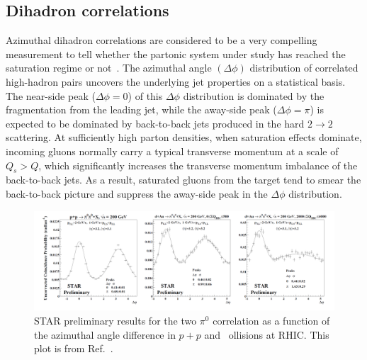 \subsection{Dihadron correlations}
Azimuthal dihadron
correlations are considered to be a very compelling measurement to tell whether
the partonic system under study has reached the saturation regime or
not~\cite{Kharzeev:2004bw}. The azimuthal angle $(\Delta\phi)$ distribution of
correlated high-\pt hadron pairs uncovers the underlying jet properties on a
statistical basis. The near-side peak ($\Delta\phi=0$) of this $\Delta\phi$
distribution is dominated by the fragmentation from the leading jet, while the
away-side peak ($\Delta\phi=\pi$) is expected to be dominated by back-to-back
jets produced in the hard $2\rightarrow2$ scattering. At sufficiently high
parton densities, when saturation effects dominate, incoming gluons normally
carry a typical transverse momentum at a scale of $Q_{s}>Q$, which significantly
increases the transverse momentum imbalance of the back-to-back jets. As a
result, saturated gluons from the target tend to smear the back-to-back picture
and suppress the away-side peak in the $\Delta\phi$ distribution.

\begin{figure}
\centering
\includegraphics[width=1.0\textwidth]{plots/chpt3/dihadron_pp_dAu_periph_cen.png}
\caption[Dihadron correlations in $d+$Au]{
STAR preliminary results for the two $\pi^{0}$ correlation as a function of the
azimuthal angle difference in $p+p$ and \dA\ ollisions at RHIC. This plot is from Ref.~\cite{Braidot:2010ig}.}
\label{fig:dihadron_dAu}
\end{figure}


